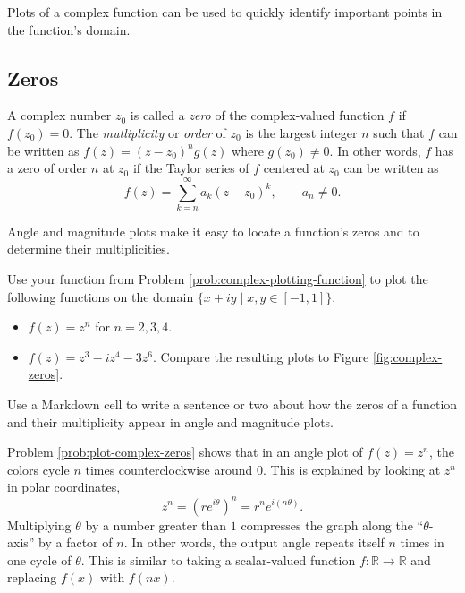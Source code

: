 Plots of a complex function can be used to quickly identify important points in the function's domain.

\subsection*{Zeros} %

A complex number $z_0$ is called a \emph{zero} of the complex-valued function $f$ if $f(z_0) = 0$.
The \emph{mutliplicity} or \emph{order} of $z_0$ is the largest integer $n$ such that $f$ can be written as $f(z) = (z - z_0)^n g(z)$ where $g(z_0) \ne 0$.
In other words, $f$ has a zero of order $n$ at $z_0$ if the Taylor series of $f$ centered at $z_0$ can be written as
\[
f(z) = \sum_{k=n}^{\infty} a_k(z-z_0)^k, \qquad  a_n \neq 0.
\]

Angle and magnitude plots make it easy to locate a function's zeros and to determine their multiplicities.

\begin{problem} %
Use your function from Problem \ref{prob:complex-plotting-function} to plot the following functions on the domain $\{x+iy \mid x,y \in [-1,1]\}$.
\begin{itemize}
\item $f(z) = z^n$ for $n=2,3,4$.
\item $f(z) = z^3 - iz^4 - 3z^6$.
Compare the resulting plots to Figure \ref{fig:complex-zeros}.
\end{itemize}
Use a Markdown cell to write a sentence or two about how the zeros of a function and their multiplicity appear in angle and magnitude plots.
\label{prob:plot-complex-zeros}
\end{problem}


Problem \ref{prob:plot-complex-zeros} shows that in an angle plot of $f(z) = z^n$, the colors cycle $n$ times counterclockwise around 0.
This is explained by looking at $z^n$ in polar coordinates,
\[
z^n = (re^{i \theta})^n = r^n e^{i(n\theta)}.
\]
Multiplying $\theta$ by a number greater than $1$ compresses the graph along the ``$\theta$-axis'' by a factor of $n$.
In other words, the output angle repeats itself $n$ times in one cycle of $\theta$.
This is similar to taking a scalar-valued function $f:\mathbb{R}\rightarrow\mathbb{R}$ and replacing $f(x)$ with $f(nx)$.

